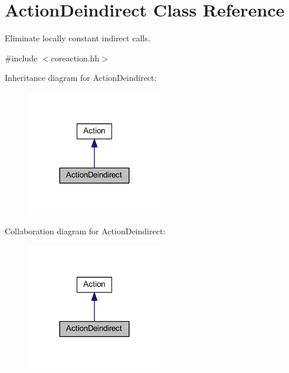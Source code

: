 \hypertarget{class_action_deindirect}{}\section{Action\+Deindirect Class Reference}
\label{class_action_deindirect}


Eliminate locally constant indirect calls.  




{\ttfamily \#include $<$coreaction.\+hh$>$}



Inheritance diagram for Action\+Deindirect\+:
\nopagebreak
\begin{figure}[H]
\begin{center}
\leavevmode
\includegraphics[width=168pt]{class_action_deindirect__inherit__graph}
\end{center}
\end{figure}


Collaboration diagram for Action\+Deindirect\+:
\nopagebreak
\begin{figure}[H]
\begin{center}
\leavevmode
\includegraphics[width=168pt]{class_action_deindirect__coll__graph}
\end{center}
\end{figure}
